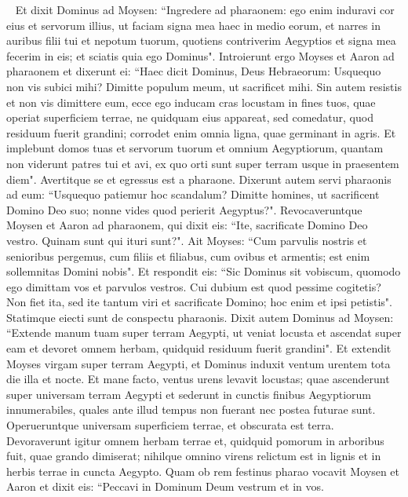 \begin{biblechapter}    
\verse Et dixit Dominus ad Moysen: “Ingredere ad pharaonem: ego enim induravi cor eius et servorum illius, ut faciam signa mea haec in medio eorum,  
\verse et narres in auribus filii tui et nepotum tuorum, quotiens contriverim Aegyptios et signa mea fecerim in eis; et sciatis quia ego Dominus". 
\verse Introierunt ergo Moyses et Aaron ad pharaonem et dixerunt ei: “Haec dicit Dominus, Deus Hebraeorum: Usquequo non vis subici mihi? Dimitte populum meum, ut sacrificet mihi.  
\verse Sin autem resistis et non vis dimittere eum, ecce ego inducam cras locustam in fines tuos,  
\verse quae operiat superficiem terrae, ne quidquam eius appareat, sed comedatur, quod residuum fuerit grandini; corrodet enim omnia ligna, quae germinant in agris.  
\verse Et implebunt domos tuas et servorum tuorum et omnium Aegyptiorum, quantam non viderunt patres tui et avi, ex quo orti sunt super terram usque in praesentem diem". Avertitque se et egressus est a pharaone. 
\verse Dixerunt autem servi pharaonis ad eum: “Usquequo patiemur hoc scandalum? Dimitte homines, ut sacrificent Domino Deo suo; nonne vides quod perierit Aegyptus?".  
\verse Revocaveruntque Moysen et Aaron ad pharaonem, qui dixit eis: “Ite, sacrificate Domino Deo vestro. Quinam sunt qui ituri sunt?".  
\verse Ait Moyses: “Cum parvulis nostris et senioribus pergemus, cum filiis et filiabus, cum ovibus et armentis; est enim sollemnitas Domini nobis".  
\verse Et respondit eis: “Sic Dominus sit vobiscum, quomodo ego dimittam vos et parvulos vestros. Cui dubium est quod pessime cogitetis?  
\verse Non fiet ita, sed ite tantum viri et sacrificate Domino; hoc enim et ipsi petistis". Statimque eiecti sunt de conspectu pharaonis. 
\verse Dixit autem Dominus ad Moysen: “Extende manum tuam super terram Aegypti, ut veniat locusta et ascendat super eam et devoret omnem herbam, quidquid residuum fuerit grandini". 
\verse Et extendit Moyses virgam super terram Aegypti, et Dominus induxit ventum urentem tota die illa et nocte. Et mane facto, ventus urens levavit locustas; 
\verse quae ascenderunt super universam terram Aegypti et sederunt in cunctis finibus Aegyptiorum innumerabiles, quales ante illud tempus non fuerant nec postea futurae sunt. 
\verse Operueruntque universam superficiem terrae, et obscurata est terra. Devoraverunt igitur omnem herbam terrae et, quidquid pomorum in arboribus fuit, quae grando dimiserat; nihilque omnino virens relictum est in lignis et in herbis terrae in cuncta Aegypto. 
\verse Quam ob rem festinus pharao vocavit Moysen et Aaron et dixit eis: “Peccavi in Dominum Deum vestrum et in vos. 

\end{biblechapter}
